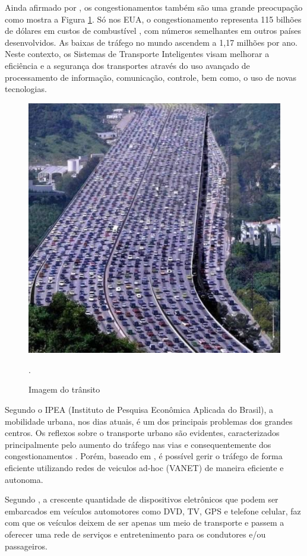 \documentclass[
	12pt,				%
	oneside,			%
	a4paper,			%
	english,			%
	brazil				%
	]{abntex2ppgsi}
\begin{document}
Ainda afirmado por  , os congestionamentos também são uma grande preocupação como mostra a Figura \ref{fig:transito}.  Só nos EUA, o congestionamento representa 115 bilhões de dólares em custos de combustível \cite{TTI}, com números semelhantes em outros países desenvolvidos. As baixas de tráfego no mundo ascendem a 1,17 milhões por ano. Neste contexto, os Sistemas de Transporte Inteligentes visam melhorar a eficiência e a segurança dos transportes através do uso avançado de processamento de informação, comunicação, controle, bem como, o uso de novas tecnologias.

\begin{figure}[h!]
	\centering
	\includegraphics[width=0.7\columnwidth]{images/transito2.jpeg}
	\caption{Imagem do trânsito \cite{autoentusiastasclassic}}.
	\label{fig:transito}
\end{figure}


Segundo o IPEA (Instituto de Pesquisa Econômica Aplicada do Brasil), a mobilidade urbana, nos dias atuais, é um dos principais problemas dos grandes centros. Os reflexos sobre o transporte urbano são evidentes, caracterizados principalmente pelo aumento do tráfego nas vias e consequentemente dos congestionamentos \cite{carvalho2010mobilidade}. Porém, baseado em  , é possível gerir o tráfego de forma eficiente utilizando redes de veiculos ad-hoc (VANET) de maneira eficiente e autonoma.

Segundo  , a crescente quantidade de dispositivos eletrônicos que podem ser embarcados em veículos automotores como DVD, TV, GPS e telefone celular, faz com que os veículos deixem de ser apenas um meio de transporte e passem a oferecer uma rede de serviços e entretenimento para os condutores e/ou passageiros.
\end{document}
